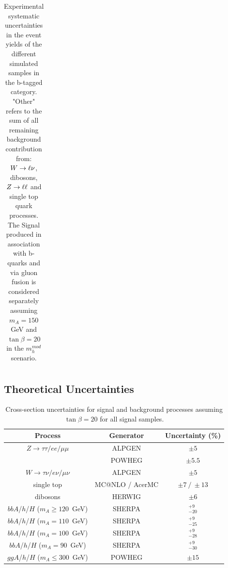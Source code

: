 \begin{table}[tp]
\begin{tabular}{lccccc}
    \hline
    \hline
  \end{tabular}
  \caption{Experimental systematic uncertainties in the event yields of the different
	simulated samples in the b-tagged category. "Other" refers to the sum of all remaining background contribution from: $W\rightarrow \ell \nu$, 
	dibosons, $Z\rightarrow \ell \ell$ and single top quark processes. The Signal produced in association with b-quarks  and via 
	gluon fusion is considered separately assuming $m_{A}=150$ GeV and $\tan\beta=20$ in the $m_h^{mod}$ scenario.} 

  \label{tab:ExpSys:btag}
\end{table}




\subsection{Theoretical Uncertainties}
\label{sec:sys_theory}


\begin{table} [!t]
\caption{Cross-section uncertainties for signal and background  processes assuming $\tan\beta = 20$ for all signal samples.} \vspace{3mm}
\centering
\begin{tabular}{c c c }
\hline
\hline
Process 					&  Generator		& Uncertainty (\%) \\ [0.5ex]
\hline
 $Z \rightarrow \tau\tau / ee /\mu\mu$ 		& ALPGEN		&  $\pm 5$ \\ [0.5ex]
 \ttbar						& POWHEG		&  $\pm 5.5$\\ [0.5ex]
 $W  \rightarrow \tau\nu / e\nu /\mu\nu$	& ALPGEN		&  $\pm  5$ \\ [0.5ex]
 single top 					& MC@NLO / AcerMC	&  $\pm 7 ~ / ~\pm 13 $ \\ [0.5ex]
 dibosons 					& HERWIG		&  $\pm 6 $ 		\\ [0.8ex]
 $bbA$/$h$/$H$  ($m_{A} \ge 120$~GeV)     	& SHERPA		&  $_{-20}^{+9}$	\\ [0.8ex]
 $bbA$/$h$/$H$  ($m_{A} =   110$~GeV)     	& SHERPA		&  $_{-25}^{+9}$	\\ [0.8ex]
 $bbA$/$h$/$H$  ($m_{A} =   100$~GeV)     	& SHERPA		&  $_{-28}^{+9}$	\\ [0.8ex]
 $bbA$/$h$/$H$  ($m_{A} =    90$~GeV)     	& SHERPA		&  $_{-30}^{+9}$	\\ [0.8ex]
 $ggA$/$h$/$H$  ($m_{A} \le 300$~GeV)     	& POWHEG		&  $\pm 15$		\\[0.5ex]
\hline \hline 
\end{tabular}
\label{table:sys_xsec}
\end{table}


